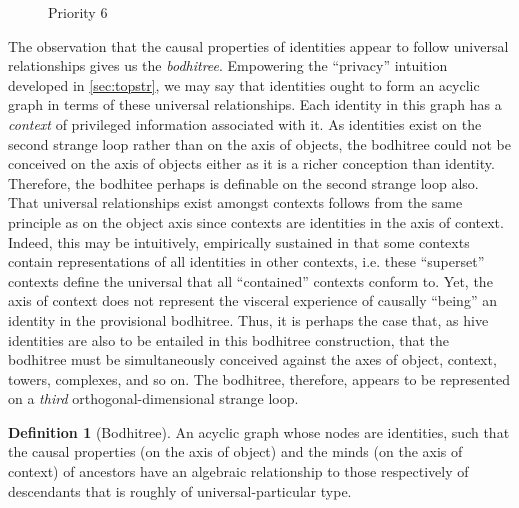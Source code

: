 \documentclass[pra,twocolumn,groupedaddress,10pt]{revtex4}
\theoremstyle{definition}
\newtheorem{defn}{Definition}[section]
\begin{document}
\begin{enumerate}[label={[\textbf{\arabic*}]},start=0]
\begin{figure}[htp]
			\caption{\label{fig:epipri6}Priority 6}
		\end{figure}

		The observation that the causal properties of identities appear to follow universal relationships gives us the \emph{bodhitree}. Empowering the ``privacy'' intuition developed in \autoref{sec:topstr}, we may say that identities ought to form an acyclic graph in terms of these universal relationships. Each identity in this graph has a \emph{context} of privileged information associated with it. As identities exist on the second strange loop rather than on the axis of objects, the bodhitree could not be conceived on the axis of objects either as it is a richer conception than identity. Therefore, the bodhitee perhaps is definable on the second strange loop also. That universal relationships exist amongst contexts follows from the same principle as on the object axis since contexts are identities in the axis of context. Indeed, this may be intuitively, empirically sustained in that some contexts contain representations of all identities in other contexts, i.e. these ``superset'' contexts define the universal that all ``contained'' contexts conform to. Yet, the axis of context does not represent the visceral experience of causally ``being'' an identity in the provisional bodhitree. Thus, it is perhaps the case that, as hive identities are also to be entailed in this bodhitree construction, that the bodhitree must be simultaneously conceived against the axes of object, context, towers, complexes, and so on. The bodhitree, therefore, appears to be represented on a \emph{third} orthogonal-dimensional strange loop.

		\begin{defn}[Bodhitree]
			An acyclic graph whose nodes are identities, such that the causal properties (on the axis of object) and the minds (on the axis of context) of ancestors have an algebraic relationship to those respectively of descendants that is roughly of universal-particular type.
		\end{defn}


\end{enumerate}
\end{document}
